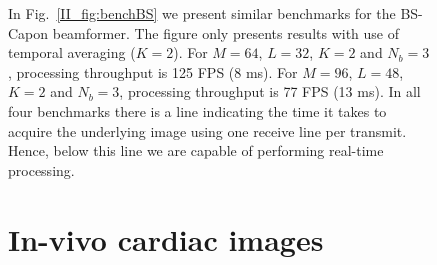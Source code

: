 \begin{figure}[!t]
In Fig.\ \ref{II_fig:benchBS} we present similar benchmarks for the BS-Capon beamformer. The figure only presents results with use of temporal averaging ($K=2$). For $M=64$, $L=32$, $K=2$ and $N_b=3$, processing throughput is 125 FPS (8 ms). For $M=96$, $L=48$, $K=2$ and $N_b=3$, processing throughput is 77 FPS (13 ms). In all four benchmarks there is a line indicating the time it takes to acquire the underlying image using one receive line per transmit. Hence, below this line we are capable of performing real-time processing.

\section{In-vivo cardiac images}\label{II_sec:images}



\end{figure}
